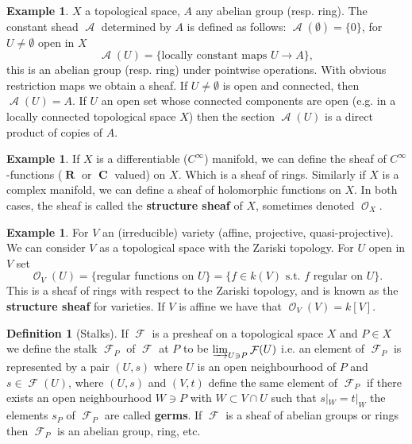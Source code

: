 \documentclass[10pt,]{book}
\newcommand{\terminology}[1]{\textbf{#1}}
\theoremstyle{plain}
\theoremstyle{definition}
\newtheorem{definition}[theorem]{Definition}
\newtheorem{example}[theorem]{Example}
\DeclareMathOperator{\CC}{\mathbf{C}}
\DeclareMathOperator{\RR}{\mathbf{R}}
\DeclareMathOperator{\A}{\mathcal{A}}
\DeclareMathOperator{\F}{\mathcal{F}}
\DeclareMathOperator{\cO}{\mathcal{O}}
\begin{document}
\begin{example}\label{example-1}
\(X\) a topological space, \(A\) any abelian group (resp. ring).
            The constant shead \(\A\) determined by \(A\) is defined as follows: \(\A(\emptyset) = \{0\}\), for \(U \ne \emptyset\) open in \(X\)\[\A(U) = \{\text{locally constant maps }U\to A\},\] this is an abelian group (resp. ring) under pointwise operations.
            With obvious restriction maps we obtain a sheaf.
            If \(U \ne \emptyset\) is open and connected, then \(\A(U) = A\).
            If \(U\) an open set whose connected components are open (e.g. in a locally connected topological space \(X\)) then the section \(\A(U)\) is a direct product of copies of \(A\).
          \end{example}
\begin{example}\label{example-2}
If \(X\) is a differentiable (\(C^\infty\)) manifold, we can define the sheaf of \(C^\infty\)-functions (\(\RR\) or \(\CC\) valued) on \(X\).
            Which is a sheaf of rings.
            Similarly if \(X\) is a complex manifold, we can define a sheaf of holomorphic functions on \(X\).
            In both cases, the sheaf is called the \terminology{structure sheaf} of \(X\), sometimes denoted \(\cO_X\).
          \end{example}
\begin{example}\label{example-3}
For \(V\) an (irreducible) variety (affine, projective, quasi-projective).
            We can consider \(V\) as a topological space with the Zariski topology.
            For \(U\) open in \(V\) set \[\cO_V(U)=\{\text{regular functions on } U\} = \{f\in k(V) \text{ s.t. }f \text{ regular on } U\}.\]
            This is a sheaf of rings with respect to the Zariski topology, and is known as the \terminology{structure sheaf} for varieties.
            If \(V\) is affine we have that \(\cO_V(V) = k[V]\).
          \end{example}
\begin{definition}[Stalks]\label{definition-3}
If \(\F\) is a presheaf on a topological space \(X\) and \(P\in X\) we define the stalk \(\F_P\) of \(\F\) at \(P\) to be \(\varinjlim_{U\ni P} \F(U)\) i.e. an element of \(\F_P\) is represented by a pair \((U,s)\) where \(U\) is an open neighbourhood of \(P\) and \(s\in \F(U)\), where \((U,s)\) and \((V,t)\) define the same element of \(\F_P\) if there exists an open neighbourhood \(W\ni P\) with \(W\subset V\cap U\) such that \(s|_W = t|_W\) the elements \(s_P\) of \(\F_P\) are called \terminology{germs}.
            If \(\F\) is a sheaf of abelian groups or rings then \(\F_P\) is an abelian group, ring, etc.
          \end{definition}
\end{document}
